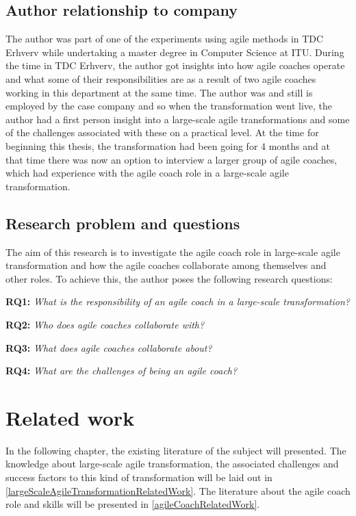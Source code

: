 \documentclass[11pt,a4paper]{report}
\begin{document}
\section{Author relationship to company}
The author was part of one of the experiments using agile methods in TDC Erhverv while undertaking a master degree in Computer Science at ITU. During the time in TDC Erhverv, the author got insights into how agile coaches operate and what some of their responsibilities are as a result of two agile coaches working in this department at the same time. The author was and still is employed by the case company and so when the transformation went live, the author had a first person insight into a large-scale agile transformations and some of the challenges associated with these on a practical level. At the time for beginning this thesis, the transformation had been going for 4 months and at that time there was now an option to interview a larger group of agile coaches, which had experience with the agile coach role in a large-scale agile transformation.

\section{Research problem and questions}
The aim of this research is to investigate the agile coach role in large-scale agile transformation and how the agile coaches collaborate among themselves and other roles. To achieve this, the author poses the following research questions:
\newline

\textbf{RQ1:} \emph{What is the responsibility of an agile coach in a large-scale transformation?}

\textbf{RQ2:} \emph{Who does agile coaches collaborate with?}

\textbf{RQ3:} \emph{What does agile coaches collaborate about?}

\textbf{RQ4:} \emph{What are the challenges of being an agile coach?}

\chapter{Related work}
In the following chapter, the existing literature of the subject will presented. The knowledge about large-scale agile transformation, the associated challenges and success factors to this kind of transformation  will be laid out in \autoref{largeScaleAgileTransformationRelatedWork}. The literature about the agile coach role and skills will be presented in \autoref{agileCoachRelatedWork}.
\end{document}
